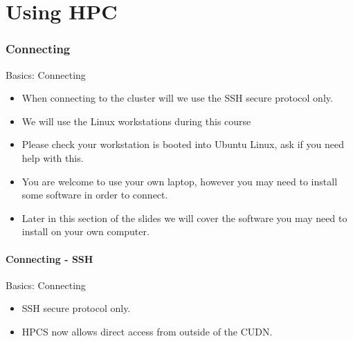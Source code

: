 \part{Using HPC}
\begin{frame}
\partpage
\end{frame}

\section{Connecting}
\begin{frame}{Basics: Connecting}
\begin{itemize}
\item When connecting to the cluster will we use the SSH secure protocol only.
\item We will use the Linux workstations during this course
\item Please check your workstation is booted into Ubuntu Linux, ask if you need help with this.
\item You are welcome to use your own laptop, however you may need to install some software in order to connect.
\item Later in this section of the slides we will cover the software you may need to install on your own computer.
\end{itemize}
\end{frame}

\subsection{Connecting - SSH}
\begin{frame}{Basics: Connecting}
\begin{itemize}
\item SSH secure protocol only.\hfill\\
\item<3-> HPCS now allows direct access from outside of the CUDN.\hfill\\
\hfill\\
\end{itemize}
\end{frame}

